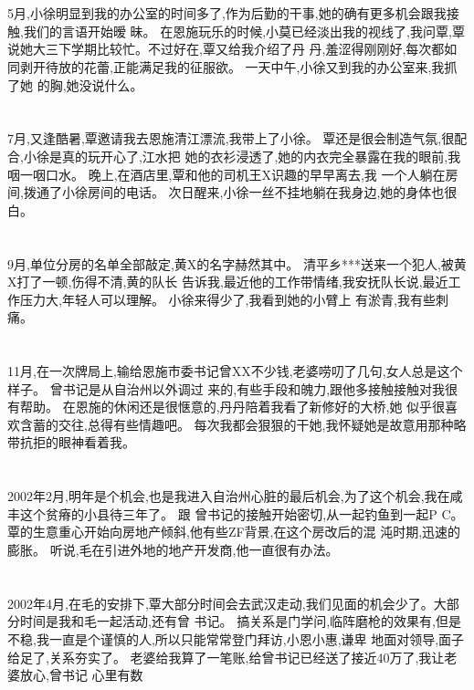\documentclass[11pt]{article}
\begin{document}
\section{}
5月,小徐明显到我的办公室的时间多了,作为后勤的干事,她的确有更多机会跟我接触,我们的言语开始暧
昧。 在恩施玩乐的时候,小莫已经淡出我的视线了,我问覃,覃说她大三下学期比较忙。不过好在,覃又给我介绍了丹
丹,羞涩得刚刚好,每次都如同剥开待放的花蕾,正能满足我的征服欲。 一天中午,小徐又到我的办公室来,我抓了她
的胸,她没说什么。

\section{}
7月,又逢酷暑,覃邀请我去恩施清江漂流,我带上了小徐。 覃还是很会制造气氛,很配合,小徐是真的玩开心了,江水把
她的衣衫浸透了,她的内衣完全暴露在我的眼前,我咽一咽口水。 晚上,在酒店里,覃和他的司机王X识趣的早早离去,我
一个人躺在房间,拨通了小徐房间的电话。 次日醒来,小徐一丝不挂地躺在我身边,她的身体也很白。

\section{}
9月,单位分房的名单全部敲定,黄X的名字赫然其中。 清平乡***送来一个犯人,被黄X打了一顿,伤得不清,黄的队长
告诉我,最近他的工作带情绪,我安抚队长说,最近工作压力大,年轻人可以理解。 小徐来得少了,我看到她的小臂上
有淤青,我有些刺痛。

\section{}
11月,在一次牌局上,输给恩施市委书记曾XX不少钱,老婆唠叨了几句,女人总是这个样子。 曾书记是从自治州以外调过
来的,有些手段和魄力,跟他多接触接触对我很有帮助。 在恩施的休闲还是很惬意的,丹丹陪着我看了新修好的大桥,她
似乎很喜欢含蓄的交往,总得有些情趣吧。 每次我都会狠狠的干她,我怀疑她是故意用那种略带抗拒的眼神看着我。

\section{}
2002年2月,明年是个机会,也是我进入自治州心脏的最后机会,为了这个机会,我在咸丰这个贫瘠的小县待三年了。 跟
曾书记的接触开始密切,从一起钓鱼到一起P C。 覃的生意重心开始向房地产倾斜,他有些ZF背景,在这个房改后的混
沌时期,迅速的膨胀。 听说,毛在引进外地的地产开发商,他一直很有办法。

\section{}
2002年4月,在毛的安排下,覃大部分时间会去武汉走动,我们见面的机会少了。大部分时间是我和毛一起活动,还有曾
书记。 搞关系是门学问,临阵磨枪的效果有,但是不稳,我一直是个谨慎的人,所以只能常常登门拜访,小恩小惠,谦卑
地面对领导,面子给足了,关系夯实了。 老婆给我算了一笔账,给曾书记已经送了接近40万了,我让老婆放心,曾书记
心里有数
\end{document}
